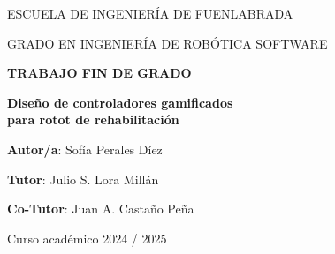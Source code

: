\thispagestyle{empty}
\vspace{2cm}

\begin{figure}[htb]
  \centerline{}
\end{figure}

\begin{center}
  \vspace{5mm}
    {\Large {ESCUELA DE INGENIERÍA DE FUENLABRADA}}
  \vspace{1cm}
  
  {\Large {GRADO EN INGENIERÍA DE ROBÓTICA SOFTWARE}}
  \vspace{20mm}

   {\Large {\textbf{TRABAJO FIN DE GRADO}}}


   \vspace{2cm}

  {\large \textbf{Diseño de controladores gamificados\\
               para rotot de rehabilitación }}

  \vspace{2cm}
  
  {\bf Autor/a}: Sofía Perales Díez
  
  {\bf Tutor}: Julio S. Lora Millán 
  
  {\bf Co-Tutor}: Juan A. Castaño Peña \\

\vspace{3cm}

  Curso académico 2024 / 2025

 
\end{center}

\clearpage
\thispagestyle{empty}
